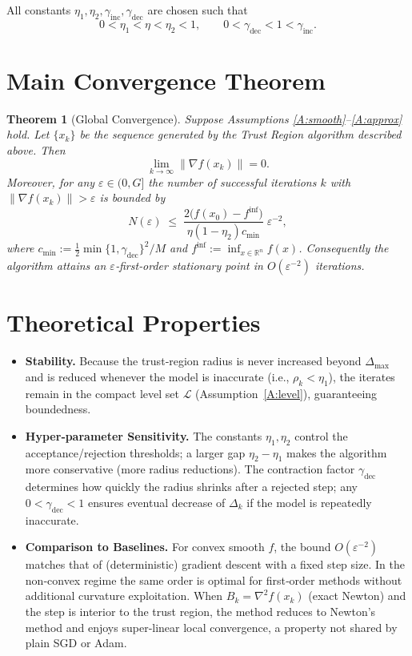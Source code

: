 \documentclass{article}
\newtheorem{theorem}{Theorem}
\newcommand{\norm}[1]{\left\lVert #1\right\rVert}
\newcommand{\R}{\mathbb{R}}
\begin{document}
All constants $\eta_{1},\eta_{2},\gamma_{\text{inc}},\gamma_{\text{dec}}$ are chosen such that 
\[
0<\eta_{1}<\eta<\eta_{2}<1,\qquad
0<\gamma_{\text{dec}}<1<\gamma_{\text{inc}}.
\]

\section*{Main Convergence Theorem}
\begin{theorem}[Global Convergence]\label{thm:global}
Suppose Assumptions \ref{A:smooth}–\ref{A:approx} hold.  
Let $\{x_{k}\}$ be the sequence generated by the Trust Region algorithm described above.  
Then
\[
\lim_{k\to\infty}\norm{\nabla f(x_{k})}=0.
\]
Moreover, for any $\varepsilon\in(0,G]$ the number of \emph{successful} iterations $k$ with
$\norm{\nabla f(x_{k})}>\varepsilon$ is bounded by
\[
N(\varepsilon)\;\le\;
\frac{2\bigl(f(x_{0})-f^{\inf}\bigr)}{\eta(1-\eta_{2})c_{\min}}\;\varepsilon^{-2},
\]
where $c_{\min}:=\tfrac12\min\{1,\gamma_{\text{dec}}\}^{2}/M$ and $f^{\inf}:=\inf_{x\in\R^{n}}f(x)$.
Consequently the algorithm attains an $\varepsilon$‑first‑order stationary point in
$O(\varepsilon^{-2})$ iterations.
\end{theorem}

\section*{Theoretical Properties}
\begin{itemize}
\item \textbf{Stability.}  Because the trust‑region radius is never increased beyond $\Delta_{\max}$ and is reduced whenever the model is inaccurate (i.e., $\rho_{k}<\eta_{1}$), the iterates remain in the compact level set $\mathcal{L}$ (Assumption~\ref{A:level}), guaranteeing boundedness.

\item \textbf{Hyper‑parameter Sensitivity.}  The constants $\eta_{1},\eta_{2}$ control the acceptance/rejection thresholds; a larger gap $\eta_{2}-\eta_{1}$ makes the algorithm more conservative (more radius reductions).  The contraction factor $\gamma_{\text{dec}}$ determines how quickly the radius shrinks after a rejected step; any $0<\gamma_{\text{dec}}<1$ ensures eventual decrease of $\Delta_{k}$ if the model is repeatedly inaccurate.

\item \textbf{Comparison to Baselines.}  For convex smooth $f$, the bound $O(\varepsilon^{-2})$ matches that of (deterministic) gradient descent with a fixed step size.  In the non‑convex regime the same order is optimal for first‑order methods without additional curvature exploitation.  When $B_{k}=\nabla^{2}f(x_{k})$ (exact Newton) and the step is interior to the trust region, the method reduces to Newton’s method and enjoys super‑linear local convergence, a property not shared by plain SGD or Adam.

\end{itemize}
\end{document}
